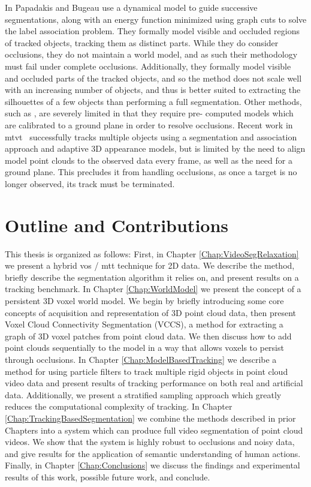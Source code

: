 In \cite{TrackingOcclusionsGraphCuts} Papadakis and Bugeau use a dynamical model to guide successive segmentations, along with an energy function minimized using graph cuts to solve the label association problem. They formally model visible and occluded regions of tracked objects, tracking them as distinct parts. While they do consider occlusions, they do not maintain a world model, and as such their methodology must fail under complete occlusions.  Additionally, they formally model visible and occluded parts of the tracked objects, and so the method does not scale well with an increasing number of objects, and thus is better suited to extracting the silhouettes of a few objects than performing a full segmentation. Other methods, such as \cite{LayeredGraphicalModels}, are severely limited in that they require pre-
computed models which are calibrated to a ground plane in order to resolve occlusions. Recent work in \gls{mtvt}~\cite{MultiObjectTracking} successfully tracks multiple objects using a segmentation and association approach and adaptive 3D appearance models, but is limited by the need to align model point clouds to the observed data every frame, as well as the need for a ground plane. This precludes it from handling occlusions, as once a target is no longer observed, its track must be terminated.

\section{Outline and Contributions}

This thesis is organized as follows: First, in Chapter \ref{Chap:VideoSegRelaxation} we present a hybrid \gls{vos} / \gls{mtt} technique for 2D data. We describe the method, briefly describe the segmentation algorithm it relies on, and present results on a tracking benchmark. In Chapter \ref{Chap:WorldModel} we present the concept of a persistent 3D voxel world model. We begin by briefly introducing some core concepts of acquisition and representation of 3D point cloud data, then present Voxel Cloud Connectivity Segmentation (VCCS), a method for extracting a graph of 3D voxel patches from point cloud data. We then discuss how to add point clouds sequentially to the model in a way that allows voxels to persist through occlusions. In Chapter \ref{Chap:ModelBasedTracking} we describe a method for using particle filters to track multiple rigid objects in point cloud video data and present results of tracking performance on both real and artificial data. Additionally, we present a stratified sampling approach which greatly reduces the computational complexity of tracking. In Chapter \ref{Chap:TrackingBasedSegmentation} we combine the methods described in prior Chapters into a system which can produce full video segmentation of point cloud videos. We show that the system is highly robust to occlusions and noisy data, and give results for the application of semantic understanding of human actions. Finally, in Chapter \ref{Chap:Conclusions} we discuss the findings and experimental results of this work, possible future work, and conclude.

